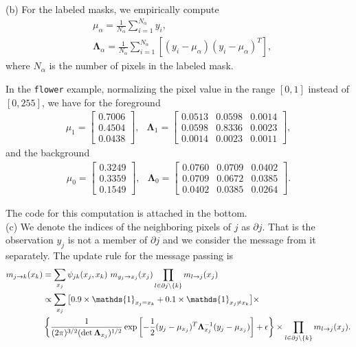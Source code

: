 \documentclass{article}
\begin{document}
\noindent
(b) For the labeled masks, we empirically compute
\begin{align*}
	&\mu_\alpha = \frac{1}{N_\alpha}\sum_{i=1}^{N_\alpha}y_i,\\
	&\mathbf{\Lambda}_{\alpha} = \frac{1}{N_\alpha}\sum_{i=1}^{N_\alpha}\left[(y_i - \mu_\alpha)(y_i - \mu_\alpha)^T\right],
\end{align*}
where $N_\alpha$ is the number of pixels in the labeled mask.
%

In the \texttt{flower} example, normalizing the pixel value
in the range $[0, 1]$ instead of $[0, 255]$, we have for the foreground
%
\begin{align*}
	\mu_1 = 
	\begin{bmatrix}
    0.7006 \\
    0.4504 \\
    0.0438
\end{bmatrix}, \;\;\,
	\mathbf{\Lambda}_1 =
\begin{bmatrix}
 0.0513 & 0.0598 & 0.0014 \\
 0.0598 & 0.8336 & 0.0023 \\
 0.0014 & 0.0023 & 0.0011
\end{bmatrix},
\end{align*}
and the background
\begin{align*}
	\mu_0 = 
	\begin{bmatrix}
    0.3249 \\
    0.3359 \\
    0.1549
\end{bmatrix}, \;\;\,
	\mathbf{\Lambda}_0 =
\begin{bmatrix}
0.0760 & 0.0709 & 0.0402 \\
0.0709 & 0.0672 & 0.0385 \\
0.0402 & 0.0385 & 0.0264
\end{bmatrix}.
\end{align*}

The code for this computation is attached in the bottom.
\\

\noindent
(c)
We denote the indices of the neighboring pixels of $j$ as $\partial j$. That is the observation $y_j$ is not a member of $\partial j$ and we consider the message from it separately. The update rule for the message passing is
\begin{align*}
	m_{j\to k}(x_k) &= \sum_{x_j} \psi_{jk}(x_j, x_k)\,\,m_{y_j\to x_j}(x_j) \prod_{l\in\partial{j}\backslash\{k\}}m_{l\to j}(x_j)\\
	&\propto \sum_{x_j} \big[0.9\times\mathds{1}_{x_j = x_k} + 0.1\times\mathds{1}_{x_j \neq x_k} \big] \times\\
	& \left\{\frac{1}{(2\pi)^{3/2}(\det {\bf\Lambda}_{x_j})^{1/2}} \exp\left[-\frac{1}{2}(y_j-\mu_{x_j})^T\mathbf{\Lambda}^{-1}_{x_j}(y_j - \mu_{x_j})\right] + \epsilon\right\}
	\times \prod_{l\in\partial{j}\backslash\{k\}}m_{l\to j}(x_j).
\end{align*}
%
\end{document}
